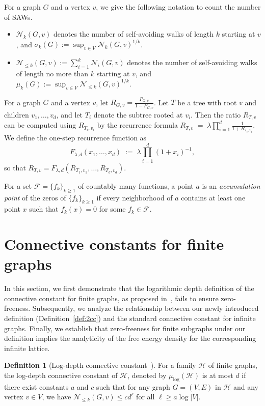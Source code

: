 \documentclass[a4paper,11pt]{article}
\theoremstyle{plain}
\theoremstyle{definition}
\newtheorem{definition}[theorem]{Definition}
\theoremstyle{remark}
\newcommand{\1}{\mathbf{1}}
\begin{document}
For a graph $G$ and a vertex $v$, we give the following notation to count the number of SAWs. 
\begin{itemize}
    \item $\mathcal{N}_k(G,v)$ denotes the number of self-avoiding walks of
length $k$ starting at $v$, and  $\sigma_{k}(G):=\sup_{v\in V}{\mathcal{N}_k(G,v)}^{1/k}$. 
\item $\mathcal{N}_{\leq k}(G,v):=\sum_{i=1}^k\mathcal{N}_i(G,v)$ denotes the number of self-avoiding walks of
length no more than $k$ starting at $v$, and $\mu_{k}(G):=\sup_{v\in V}{\mathcal{N}_{\leq k}(G,v)}^{1/k}$. 
\label{def:2cc}
\end{itemize}

For a graph $G$ and a vertex $v$, let $R_{G,v}=\frac{P_{G,v}}{1-P_{G,v}}$.
Let $T$ be a tree with root $v$ and
children $v_1,\dots,v_d$, and let $T_i$ denote the subtree rooted at $v_i$. 
Then the ratio  $R_{T,v}$ can be computed using $R_{T_i,v_i}$ by the recurrence formula $ R_{T,v} \;=\; \lambda \prod_{i=1}^{d} \frac{1}{1 + R_{T_i, v_i}}.$
We define the one-step recurrence function as
\[
F_{\lambda,d}(x_1,\dots,x_d)\;:=\;\lambda\prod_{i=1}^{d}(1+x_i)^{-1},
\]
so that $R_{T,v}=F_{\lambda,d}(R_{T_1,v_1},\dots,R_{T_d,v_d})$.

For a set $\mathcal{F}=\{f_k\}_{k\ge 1}$ of countably many functions, a point $a$ is an \emph{accumulation point} of the zeros of $\{f_k\}_{k\ge 1}$ if every neighborhood of $a$ contains at least one point $x$ such that $f_k(x)=0$ for some $f_k\in\mathcal{F}$.


\section{Connective constants for finite graphs}

In this section, we first demonstrate that the logarithmic depth definition of the connective constant for finite graphs, as proposed in~\cite{sinclair2017spatial}, fails to ensure zero-freeness.
Subsequently, we analyze the relationship between our newly introduced definition (Definition~\ref{def:2cc}) and the standard connective constant for infinite graphs.
Finally, we establish that zero-freeness for finite subgraphs under our definition implies the analyticity of the free energy density for the corresponding infinite lattice.


\begin{definition}[Log-depth connective constant~\cite{sinclair2017spatial}]
 For a family $\mathcal{H}$ of finite graphs, the log-depth connective constant of $\mathcal{H}$, denoted by $\mu_{\log}(\mathcal{H})$ is at most $d$ if there exist constants $a$ and $c$ such that for any graph $G = (V, E)$ in $\mathcal{H}$ and any vertex $v\in V$, we have $\mathcal{N}_{\leq k}(G,v)\leq c d^\ell$ for all $\ell \geq a \log|V|$.
\end{definition}
\end{document}
